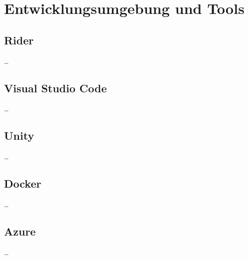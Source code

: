 \section{Entwicklungsumgebung und Tools}
\subsection*{Rider}
\ldots
\subsection*{Visual Studio Code}
\ldots
\subsection*{Unity}
\ldots
\subsection*{Docker}
\ldots
\subsection*{Azure}
\ldots
